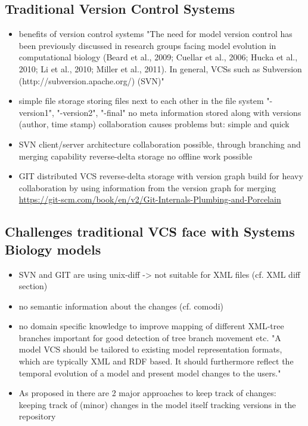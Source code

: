 	\subsection{Traditional Version Control Systems}
	\begin{itemize}
		\item benefits of version control systems
			\subitem \todo[elaborate]
			\subitem "The need for model version control has been previously discussed in research groups facing model evolution in computational biology (Beard et al., 2009; Cuellar et al., 2006; Hucka et al., 2010; Li et al., 2010; Miller et al., 2011). In general, VCSs such as Subversion (http://subversion.apache.org/) (SVN)" \cite{Waltemath2013}
		\item simple file storage
			\subitem storing files next to each other in the file system
			\subitem "-version1", "-version2", "-final"
			\subitem no meta information stored along with versions (author, time stamp)
			\subitem collaboration causes problems
			\subitem but: simple and quick
		\item SVN
			\subitem client/server architecture
			\subitem collaboration possible, through branching and merging capability
			\subitem reverse-delta storage
			\subitem no offline work possible
		\item GIT
			\subitem distributed VCS
			\subitem reverse-delta storage with version graph
			\subitem build for heavy collaboration by using information from the version graph for merging
			\subitem {}
			\subitem \url{https://git-scm.com/book/en/v2/Git-Internals-Plumbing-and-Porcelain}
	\end{itemize}
		
	\subsection{Challenges traditional VCS face with Systems Biology models}
	\begin{itemize}
		\item SVN and GIT are using unix-diff -> not suitable for XML files (cf. XML diff section)
		\item no semantic information about the changes (cf. comodi)
		\item no domain specific knowledge to improve mapping of different XML-tree branches
			\subitem important for good detection of tree branch movement etc. 
			\subitem "A model VCS should be tailored to existing model representation formats, which are typically XML and RDF based. It should furthermore reflect the temporal evolution of a model and present model changes to the users." \cite{Waltemath2013}
		\item As proposed in \cite{Waltemath2013} there are 2 major approaches to keep track of changes:
			\subitem keeping track of (minor) changes in the model itself
			\subitem tracking versions in the repository
	\end{itemize}


